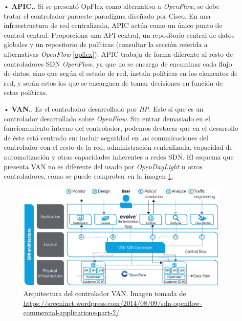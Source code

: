 \documentclass[a4paper,11pt]{book}
\begin{document}
\begin{itemize}

\item[•]\textbf{\ac{APIC}.}\cite{apic}. Si se presentó OpFlex como alternativa a \emph{OpenFlow}, se debe tratar el controlador paraeste paradigma diseñado por Cisco. En una infraestructura de red centralizada, \ac{APIC} actúa como un único punto de control central. Proporciona una \ac{API} central, un repositorio central de datos globales y un repositorio de políticas (consultar la sección referida a alternativas \emph{OpenFlow} \ref{opflex}). \ac{APIC} trabaja de forma diferente al resto de controladores \ac{SDN} \emph{OpenFlow}, ya que no se encarga de encaminar cada flujo de datos, sino que según el estado de red, instala políticas en los elementos de red, y serán estos los que se encarguen de tomar decisiones en función de estas políticas.

\item[•]\textbf{\acf{VAN}.}\cite{van}. Es el controlador desarrollado por \textit{HP}. Este si que es un controlador desarrollado sobre \emph{OpenFlow}. Sin entrar demasiado en el funcionamiento interno del controlador, podemos destacar que en el desarrollo de éste está centrado en: incluir seguridad en las comunicaciones del controlador con el resto de la red, administración centralizada, capacidad de automatización y otras capacidades inherentes a redes \ac{SDN}. El esquema que presenta \ac{VAN} no es diferente del usado por \emph{OpenDayLight} u otros controladores, como se puede comprobar en la imagen \ref{van}.

\begin{figure}[tb]
\centering
\hspace*{-1.2cm}
\includegraphics[scale=0.7]{./figuras/van}
\caption[Arquitectura controlador \ac{VAN}]{Arquitectura del controlador \ac{VAN}. Imagen tomada de \url{https://sreeninet.wordpress.com/2014/08/09/sdn-openflow-commercial-applications-part-2/}}\label{van}
\end{figure}


\end{itemize}
\end{document}
